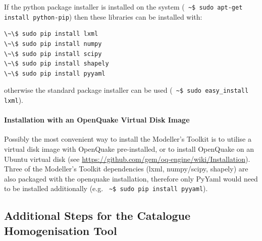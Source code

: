 If the python package installer is installed on the system (\verb*= ~$ sudo apt-get install python-pip=) then these libraries can be installed with:

\begin{Verbatim}[frame=single, commandchars=\\\{\}, fontsize=\scriptsize]
\~\$ sudo pip install lxml
\~\$ sudo pip install numpy
\~\$ sudo pip install scipy
\~\$ sudo pip install shapely
\~\$ sudo pip install pyyaml
\end{Verbatim}

otherwise the standard package installer can be used (\verb*= ~$ sudo easy_install lxml=).

\paragraph{Installation with an OpenQuake Virtual Disk Image}

Possibly the most convenient way to install the Modeller's Toolkit is to utilise a virtual disk image with OpenQuake pre-installed, or to install OpenQuake on an Ubuntu virtual disk (see \href{https://github.com/gem/oq-engine/wiki/Installation}{https://github.com/gem/oq-engine/wiki/Installation}). Three of the Modeller's Toolkit dependencies (lxml, numpy/scipy, shapely) are also packaged with the openquake installation, therefore only PyYaml would need to be installed additionally (e.g. \verb*= ~$ sudo pip install pyyaml=).

\subsection{Additional Steps for the Catalogue Homogenisation Tool}

